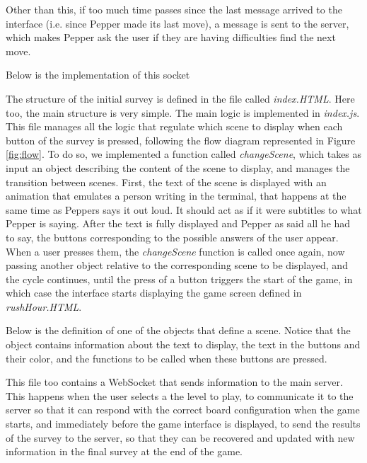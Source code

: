 \documentclass{article}
\begin{document}
Other than this, if too much time passes since the last message arrived to the interface (i.e. since Pepper made its last move), a message is sent to the server, which makes Pepper ask the user if they are having difficulties find the next move.

Below is the implementation of this socket



The structure of the initial survey is defined in the file called \textit{index.HTML}. Here too, the main structure is very simple. The main logic is implemented in \textit{index.js}. This file manages all the logic that regulate which scene to display when each button of the survey is pressed, following the flow diagram represented in Figure \ref{fig:flow}. To do so, we implemented a function called \textit{changeScene}, which takes as input an object describing the content of the scene to display, and manages the transition between scenes. First, the text of the scene is displayed with an animation that emulates a person writing in the terminal, that happens at the same time as Peppers says it out loud. It should act as if it were subtitles to what Pepper is saying. After the text is fully displayed and Pepper as said all he had to say, the buttons corresponding to the possible answers of the user appear. When a user presses them, the \textit{changeScene} function is called once again, now passing another object relative to the corresponding scene to be displayed, and the cycle continues, until the press of a button triggers the start of the game, in which case the interface starts displaying the game screen defined in \textit{rushHour.HTML}.

Below is the definition of one of the objects that define a scene. Notice that the object contains information about the text to display, the text in the buttons and their color, and the functions to be called when these buttons are pressed.



This file too contains a WebSocket that sends information to the main server. This happens when the user selects a the level to play, to communicate it to the server so that it can respond with the correct board configuration when the game starts, and immediately before the game interface is displayed, to send the results of the survey to the server, so that they can be recovered and updated with new information in the final survey at the end of the game.
\end{document}
